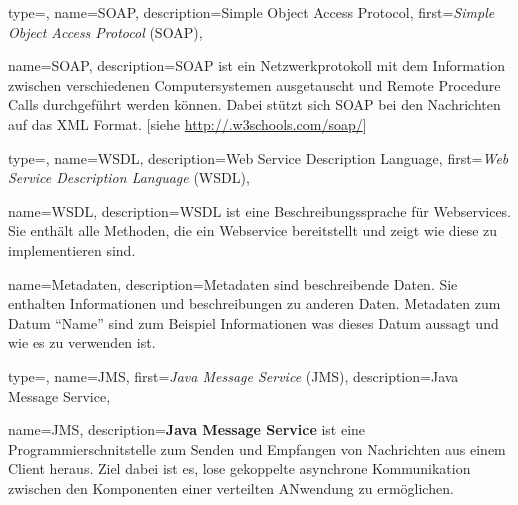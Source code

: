 

 {
	type=\acronymtype,
	name={SOAP},
	description={Simple Object Access Protocol},
	first={\textit{Simple Object Access Protocol} (SOAP)},
}

 {
	name={SOAP},
	description={SOAP ist ein Netzwerkprotokoll mit dem Information zwischen verschiedenen Computersystemen ausgetauscht und Remote Procedure Calls durchgeführt werden können. Dabei stützt sich SOAP bei den Nachrichten auf das XML Format. [siehe \url{http://.w3schools.com/soap/}]}
}

 {
	type=\acronymtype,
	name={WSDL},
	description={Web Service Description Language},
	first={\textit{Web Service Description Language} (WSDL)},
}

 {
	name={WSDL},
	description={WSDL ist eine Beschreibungssprache für Webservices. Sie enthält alle Methoden, die ein Webservice bereitstellt und zeigt wie diese zu implementieren sind.}
}

 {
	name={Metadaten},
	description={Metadaten sind beschreibende Daten. Sie enthalten Informationen und beschreibungen zu anderen Daten. Metadaten zum Datum ``Name'' sind zum Beispiel Informationen was dieses Datum aussagt und wie es zu verwenden ist.}
}

 {
	type=\acronymtype,
	name={JMS},
	first={\textit{Java Message Service} (JMS)},
	description={Java Message Service},
}

 {
	name={JMS},
	description={\textbf{Java Message Service} ist eine Programmierschnitstelle zum Senden und Empfangen von Nachrichten aus einem Client heraus. Ziel dabei ist es, lose gekoppelte asynchrone Kommunikation zwischen den Komponenten einer verteilten ANwendung zu ermöglichen.}
}

